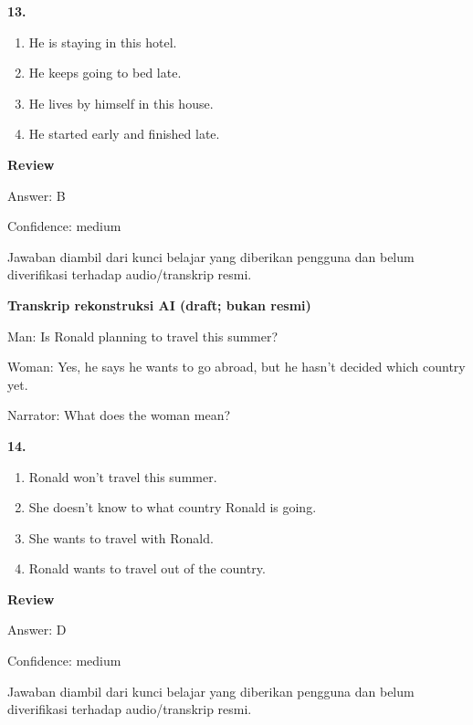 \documentclass[12pt]{article}
\begin{document}
\noindent\textbf{13.}
\begin{enumerate}[label=(\Alph*),leftmargin=*,itemsep=0.2em]
\item He is staying in this hotel.
\item He keeps going to bed late.
\item He lives by himself in this house.
\item He started early and finished late.
\end{enumerate}
\par
\begingroup
\setlength{\parskip}{0pt}
\setlength{\parindent}{0pt}
\textbf{Review}\par
Answer: B\par
Confidence: medium\par
Jawaban diambil dari kunci belajar yang diberikan pengguna dan belum diverifikasi terhadap audio/transkrip resmi.\par
\endgroup
\par
\vspace{0.25\baselineskip}
\begin{exampleblock}
\textbf{Transkrip rekonstruksi AI (draft; bukan resmi)}\par
Man: Is Ronald planning to travel this summer?\par
Woman: Yes, he says he wants to go abroad, but he hasn't decided which country yet.\par
Narrator: What does the woman mean?\par
\end{exampleblock}
\noindent\textbf{14.}
\begin{enumerate}[label=(\Alph*),leftmargin=*,itemsep=0.2em]
\item Ronald won't travel this summer.
\item She doesn't know to what country Ronald is going.
\item She wants to travel with Ronald.
\item Ronald wants to travel out of the country.
\end{enumerate}
\par
\begingroup
\setlength{\parskip}{0pt}
\setlength{\parindent}{0pt}
\textbf{Review}\par
Answer: D\par
Confidence: medium\par
Jawaban diambil dari kunci belajar yang diberikan pengguna dan belum diverifikasi terhadap audio/transkrip resmi.\par
\endgroup
\par
\end{document}
